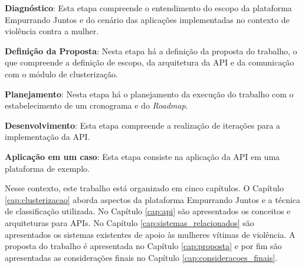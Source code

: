 \noindent \textbf{Diagnóstico}: Esta etapa compreende o entendimento do escopo da plataforma Empurrando Juntos e do cenário das 
aplicações implementadas no contexto de violência contra a mulher.

\noindent \textbf{Definição da Proposta}: Nesta etapa há a definição da proposta do trabalho, o que compreende a definição de escopo, 
da arquitetura da API e da comunicação com o módulo de clusterização.

\noindent \textbf{Planejamento}: Nesta etapa há o planejamento da execução do trabalho com o estabelecimento
de um cronograma e do \textit{Roadmap}.

\noindent \textbf{Desenvolvimento}: Esta etapa compreende a realização de iterações para a implementação da API.

\noindent \textbf{Aplicação em um caso}: Esta etapa consiste na aplicação da API em uma plataforma de exemplo.



Nesse contexto, este trabalho está organizado em cinco capítulos. O Capítulo \ref{cap:clusterizacao} aborda aspectos da plataforma
Empurrando Juntos e a técnica de classificação utilizada. No Capítulo \ref{cap:api} são apresentados os conceitos e arquiteturas para APIs.
No Capítulo \ref{cap:sistemas_relacionados} são apresentados os sistemas existentes de apoio às mulheres vítimas de violência. A proposta do trabalho
é apresentada no Capítulo \ref{cap:proposta} e por fim são apresentadas as considerações finais no Capítulo \ref{cap:consideracoes_finais}.




